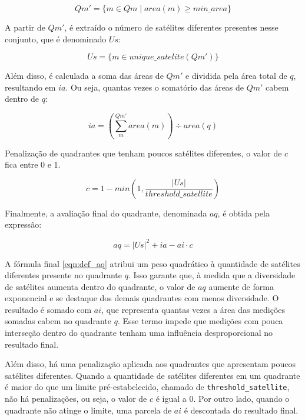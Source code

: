 \documentclass[cic,tc]{iiufrgs}
\begin{document}
\begin{equation} \label{eqn:def_qm_line}
Qm' = \{ m \in Qm \mid area\left(m\right) \ge min\_area \}
\end{equation}

A partir de $Qm'$, é extraído o número de satélites diferentes presentes nesse conjunto, que é denominado $Us$:

\begin{equation} \label{eqn:def_us}
Us = \{ m \in unique\_satelite\left(Qm'\right) \}
\end{equation}

Além disso, é calculada a soma das áreas de $Qm'$ e dividida pela área total de $q$, resultando em $ia$. Ou seja, quantas vezes o somatório das áreas de $Qm'$ cabem dentro de $q$:

\begin{equation} \label{eqn:def_ia}
ia = \left(\sum_{m}^{Qm'} area\left(m\right)\right) \div area(q)
\end{equation}

Penalização de quadrantes que tenham poucos satélites diferentes, o valor de $c$ fica entre 0 e 1.

\begin{equation} \label{eqn:def_c}
c = 1 - min\left(1, \frac{|Us|}{threshold\_satellite}\right)
\end{equation}

Finalmente, a avaliação final do quadrante, denominada $aq$, é obtida pela expressão:

\begin{equation} \label{eqn:def_aq}
aq = |Us|^2 + ia - ai \cdot c
\end{equation}

A fórmula final \ref{eqn:def_aq} atribui um peso quadrático à quantidade de satélites diferentes presente no quadrante $q$. Isso garante que, à medida que a diversidade de satélites aumenta dentro do quadrante, o valor de $aq$ aumente de forma exponencial e se destaque dos demais quadrantes com menos diversidade. O resultado é somado com $ai$, que representa quantas vezes a área das medições somadas cabem no quadrante $q$. Esse termo impede que medições com pouca interseção dentro do quadrante tenham uma influência desproporcional no resultado final.

Além disso, há uma penalização aplicada aos quadrantes que apresentam poucos satélites diferentes. Quando a quantidade de satélites diferentes em um quadrante é maior do que um limite pré-estabelecido, chamado de \texttt{threshold\_satellite}, não há penalizações, ou seja, o valor de $c$ é igual a 0. Por outro lado, quando o quadrante não atinge o limite, uma parcela de $ai$ é descontada do resultado final. 
\end{document}
